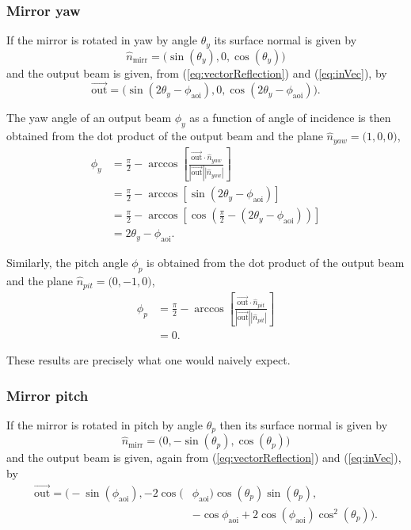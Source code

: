\documentclass[12pt]{article}
\newcommand{\threeVec}[3]{\big( {#1}, {#2}, {#3} \big)}
\newcommand{\myVec}[1]{\vec{#1}}
\begin{document}
\subsubsection{Mirror yaw}
If the mirror is rotated in yaw by angle $\theta_y$ its surface normal
is given by
\begin{equation}
  \hat{n}_\mathrm{mirr} = \big(\sin(\theta_y),0,\cos(\theta_y)\big)
\end{equation}
and the output beam is given, from (\ref{eq:vectorReflection}) and
(\ref{eq:inVec}), by
\begin{equation}
  \myVec{\mathrm{out}} = \threeVec{\sin(2\theta_y-\phi_\mathrm{aoi})}{0}{\cos(2\theta_y-\phi_\mathrm{aoi})}.
\end{equation}

The yaw angle of an output beam $\phi_y$ as a function of angle of
incidence is then obtained from the dot product of the output beam and
the plane $\hat{n}_{yaw}=\threeVec{1}{0}{0}$,
\begin{align}
  \phi_y &= \frac{\pi}{2} - \arccos\left[\frac{\myVec{\mathrm{out}}\cdot\hat{n}_{yaw}}{|\myVec{\mathrm{out}}||\hat{n}_{yaw}|}\right]\\
  &=\frac{\pi}{2} - \arccos\left[ \sin(2\theta_y-\phi_\mathrm{aoi}) \right]\\
  &=\frac{\pi}{2} - \arccos\left[ \cos\left(\frac{\pi}{2}-(2\theta_y-\phi_\mathrm{aoi})\right) \right]\\
&=2\theta_y-\phi_\mathrm{aoi}.
\end{align}

Similarly, the pitch angle $\phi_p$ is obtained from the dot product
of the output beam and the plane $\hat{n}_{pit}=\threeVec{0}{-1}{0}$,
\begin{align}
  \phi_p &= \frac{\pi}{2} - \arccos\left[\frac{\myVec{\mathrm{out}}\cdot\hat{n}_{pit}}{|\myVec{\mathrm{out}}||\hat{n}_{pit}|}\right]\\
  &=0.
\end{align}

These results are precisely what one would naively expect.

\subsubsection{Mirror pitch}
If the mirror is rotated in pitch by angle $\theta_p$ then its surface
normal is given by
\begin{equation}
  \hat{n}_\mathrm{mirr} = \threeVec{0}{-\sin(\theta_p)}{\cos(\theta_p)}
\end{equation}
and the output beam is given, again from (\ref{eq:vectorReflection})
and (\ref{eq:inVec}), by
\begin{align}
  \myVec{\mathrm{out}} = \big(-\sin(\phi_\mathrm{aoi}),-2\cos(&\phi_\mathrm{aoi})\cos(\theta_p)\sin(\theta_p),\nonumber\\
&-\cos{\phi_\mathrm{aoi}}+2\cos(\phi_\mathrm{aoi})\cos^2(\theta_p)\big).
\end{align}
\end{document}
